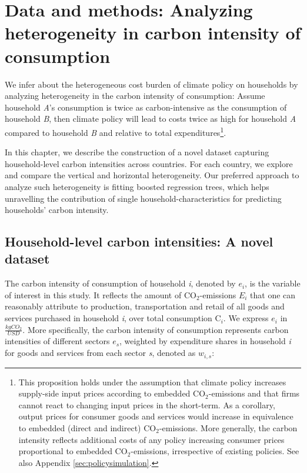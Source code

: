 \documentclass[12pt, a4paper]{article}
\begin{document}
\section{Data and methods: Analyzing heterogeneity in carbon intensity of consumption} \label{sec:data_methods}

We infer about the heterogeneous cost burden of climate policy on households by analyzing heterogeneity in the carbon intensity of consumption: Assume household \textit{A}'s consumption is twice as carbon-intensive as the consumption of household \textit{B}, then climate policy will lead to costs twice as high for household \textit{A} compared to household \textit{B} and relative to total expenditures\footnote{This proposition holds under the assumption that climate policy increases supply-side input prices according to embedded CO$_{2}$-emissions and that firms cannot react to changing input prices in the short-term. As a corollary, output prices for consumer goods and services would increase in equivalence to embedded (direct and indirect) CO$_{2}$-emissions. More generally, the carbon intensity reflects additional costs of any policy increasing consumer prices proportional to embedded CO$_{2}$-emissions, irrespective of existing policies. See also Appendix \ref{sec:policysimulation}.}.

In this chapter, we describe the construction of a novel dataset capturing household-level carbon intensities across countries. For each country, we explore and compare the vertical and horizontal heterogeneity. Our preferred approach to analyze such heterogeneity is fitting boosted regression trees, which helps unravelling the contribution of single household-characteristics for predicting households' carbon intensity.

\subsection{Household-level carbon intensities: A novel dataset} \label{sec:data}

The carbon intensity of consumption of household \textit{i}, denoted by $e_{i}$, is the variable of interest in this study. It reflects the amount of CO$_{2}$-emissions $E_{i}$ that one can reasonably attribute to production, transportation and retail of all goods and services purchased in household \textit{i}, over total consumption C$_{i}$. We express $e_{i}$ in $\frac{kgCO_{2}}{USD}$. More specifically, the carbon intensity of consumption represents carbon intensities of different sectors $e_{s}$, weighted by expenditure shares in household \textit{i} for goods and services from each sector \textit{s}, denoted as $w_{i,s}$:
\end{document}
